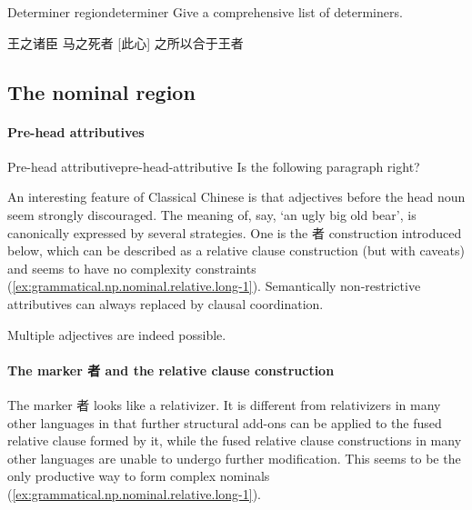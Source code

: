 \documentclass[UTF8, a4paper, oneside, scheme=plain, 12pt]{ctexrep}
\newcommand{\translate}[1]{`#1'}
\begin{document}
\begin{todobox}{Determiner region}{determiner}
    Give a comprehensive list of determiners.
\end{todobox}

\begin{exe}
    \ex\label{ex:grammatical.np.template.gen.1} 王之诸臣
    \ex\label{ex:grammatical.np.template.gen.2} 马之死者
    \ex\label{ex:grammatical.np.template.dem.1} [此心] 之所以合于王者
\end{exe}

\subsection{The nominal region} 

\paragraph*{Pre-head attributives} 

\begin{todobox}{Pre-head attributive}{pre-head-attributive}
Is the following paragraph right?

An interesting feature of Classical Chinese is 
that adjectives before the head noun seem strongly discouraged. 
The meaning of, say, \translate{an ugly big old bear},
is canonically expressed by several strategies.
One is the 者 construction introduced below, 
which can be described as a relative clause construction (but with caveats)
and seems to have no complexity constraints
(\ref{ex:grammatical.np.nominal.relative.long-1}).
Semantically non-restrictive attributives can always replaced by clausal coordination.

Multiple adjectives are indeed possible.


\end{todobox}

\paragraph*{The marker 者 and the relative clause construction} 
\label{sec:grammatical.noun-phrase.determinative-relative}
The marker 者 looks like a relativizer.
It is different from relativizers in many other languages in that
further structural add-ons can be applied to the fused relative clause formed by it,
while the fused relative clause constructions in many other languages 
are unable to undergo further modification.
This seems to be the only productive way to form complex nominals 
(\ref{ex:grammatical.np.nominal.relative.long-1}).
\end{document}
